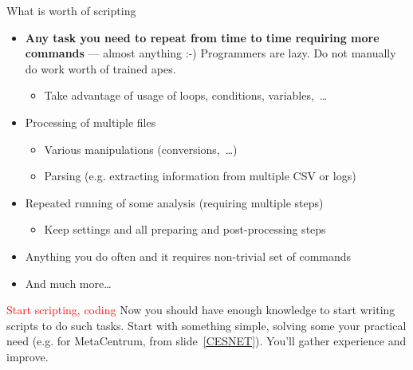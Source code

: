 \documentclass[compress, xelatex, 11pt, xcolor=svgnames, aspectratio=169, url={hyphens, lowtilde}]{beamer}
\renewcommand{\alert}[1]{\textcolor{red}{#1}}
\begin{document}
\begin{frame}{What is worth of scripting}
	\begin{itemize}
		\item \textbf{Any task you need to repeat from time to time requiring more commands} --- almost anything :-) Programmers are lazy. Do not manually do work worth of trained apes.
		\begin{itemize}
			\item Take advantage of usage of loops, conditions, variables,~\ldots
		\end{itemize}
		\item Processing of multiple files
		\begin{itemize}
			\item Various manipulations (conversions,~\ldots)
			\item Parsing (e.g. extracting information from multiple CSV or logs)
		\end{itemize}
		\item Repeated running of some analysis (requiring multiple steps)
		\begin{itemize}
			\item Keep settings and all preparing and post-processing steps
		\end{itemize}
		\item Anything you do often and it requires non-trivial set of commands
		\item And much more\ldots
	\end{itemize}
	\begin{block}{\alert{Start scripting, coding}}
		Now you should have enough knowledge to start writing scripts to do such tasks. Start with something simple, solving some your practical need (e.g. for MetaCentrum, from slide~\ref{CESNET}). You'll gather experience and improve.
	\end{block}
\end{frame}
\end{document}
